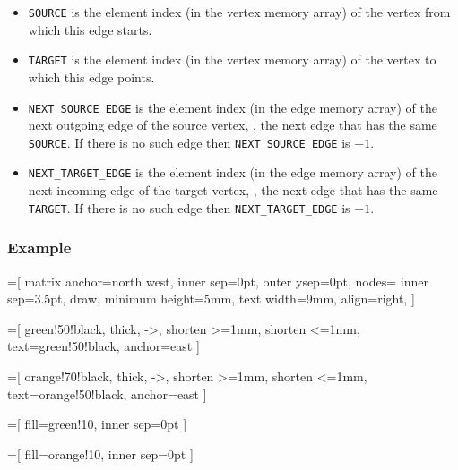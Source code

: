 \begin{itemize}
    \item \texttt{SOURCE} is the element index (in the vertex memory array) of the vertex from which this edge starts.

    \item \texttt{TARGET} is the element index (in the vertex memory array) of the vertex to which this edge points.

    \item \texttt{NEXT\_SOURCE\_EDGE} is the element index (in the edge memory array) of the next outgoing edge of the source vertex, \ie, the next edge that has the same \texttt{SOURCE}. 
    If there is no such edge then \texttt{NEXT\_SOURCE\_EDGE} is $-1$.

    \item  \texttt{NEXT\_TARGET\_EDGE} is the element index (in the edge memory array) of the next incoming edge of the target vertex, \ie, the next edge that has the same \texttt{TARGET}.
    If there is no such edge then \texttt{NEXT\_TARGET\_EDGE} is $-1$.

\end{itemize}




\subsubsection{Example}

=[
  	matrix anchor=north west,
		inner sep=0pt,
		outer ysep=0pt,
		nodes={
			inner sep=3.5pt,
			draw,
			minimum height=5mm,
			text width=9mm,
			align=right,
		}
	]

=[
		green!50!black,
		thick,
		->,
		shorten >=1mm,
		shorten <=1mm,
		text=green!50!black,
		anchor=east
	]

=[
		orange!70!black,
		thick,
		->,
		shorten >=1mm,
		shorten <=1mm,
		text=orange!50!black,
		anchor=east
	]

=[
		fill=green!10,
		inner sep=0pt
	]

=[
		fill=orange!10,
		inner sep=0pt
	]

\newcommand{\spot}[4]{
  \matrix (s) at (s.south west) [spot matrix]
  {
    \node (s#4c1) [text=red] {#1}; \\
    \node (s#4c2) [text=red] {#2}; \\
    \node (s#4c3) [minimum height=13.5mm] {}; \\
  };
	\node at (s#4c1.west) [text width=2mm, draw=none, xshift=2mm, text=black] {$#4$};
	\node at (s#4c1.west) [text width=3mm, draw=none, xshift=-1mm, text=blue, font=\scriptsize] {#3};
}

